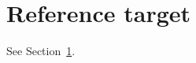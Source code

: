 \documentclass{article}
\begin{document}
\section{Reference target}\label{sec:first}

See Section~\ref{sec:first}.
\end{document}

